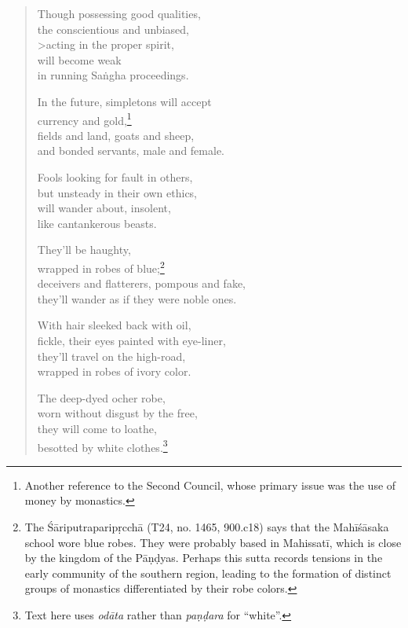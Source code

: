 \documentclass[12pt,openany]{book}%
\begin{document}
\begin{verse}
Though possessing good qualities, \\
the conscientious and unbiased, \\>acting in the proper spirit, \\
will become weak \\
in running \textsanskrit{Saṅgha} proceedings. 

In the future, simpletons will accept \\
currency and gold,\footnote{Another reference to the Second Council, whose primary issue was the use of money by monastics. } \\
fields and land, goats and sheep, \\
and bonded servants, male and female. 

Fools looking for fault in others, \\
but unsteady in their own ethics, \\
will wander about, insolent, \\
like cantankerous beasts. 

They’ll be haughty, \\
wrapped in robes of blue;\footnote{The \textsanskrit{Śāriputraparipṛcchā} (T24, no. 1465, 900.c18) says that the \textsanskrit{Mahīśāsaka} school wore blue robes. They were probably based in \textsanskrit{Mahissatī}, which is close by the kingdom of the \textsanskrit{Pāṇḍyas}. Perhaps this sutta records tensions in the early community of the southern region, leading to the formation of distinct groups of monastics differentiated by their robe colors. } \\
deceivers and flatterers, pompous and fake, \\
they’ll wander as if they were noble ones. 

With hair sleeked back with oil, \\
fickle, their eyes painted with eye-liner, \\
they’ll travel on the high-road, \\
wrapped in robes of ivory color. 

The deep-dyed ocher robe, \\
worn without disgust by the free, \\
they will come to loathe, \\
besotted by white clothes.\footnote{Text here uses \textit{\textsanskrit{odāta}} rather than \textit{\textsanskrit{paṇḍara}} for “white”. } 


\end{verse}
\end{document}
